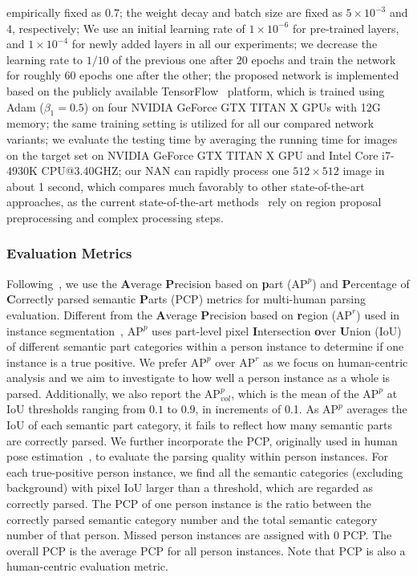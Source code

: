 \documentclass[10pt,twocolumn,letterpaper]{article}
\theoremstyle{definition}
\theoremstyle{remark}
\begin{document}
empirically fixed as $0.7$; the weight decay and batch size are fixed as $5{\times} 10^{-3}$ and $4$, respectively;  We use an initial learning rate of $1{\times} 10^{-6}$ for pre-trained layers, and $1{\times} 10^{-4}$ for newly added layers in all our experiments; we decrease the learning rate to $1/10$ of the previous one after 20 epochs and train the network for roughly 60 epochs one after the other; the proposed network is implemented based on the publicly available TensorFlow~\cite{abadi2016tensorflow} platform, which is trained using Adam ($\beta_1{=}0.5$) on four NVIDIA GeForce GTX TITAN X GPUs with 12G memory; the same training setting is utilized for all our compared network variants; we evaluate the testing time by averaging the running time for images on the target set on NVIDIA GeForce GTX TITAN X GPU and Intel Core i7-4930K CPU@3.40GHZ; our NAN can rapidly process one $512\times 512$ image in about 1 second, which compares much favorably to other state-of-the-art approaches, as the current state-of-the-art methods~\cite{li2017towards, jiang2016detangling, li2017holistic} rely on region proposal preprocessing and complex processing steps.

\vspace{-2mm}
\subsubsection{Evaluation Metrics}

Following~\cite{li2017towards}, we use the \textbf{A}verage \textbf{P}recision based on \textbf{p}art ($\mathrm{AP}^{p}$) and \textbf{P}ercentage of \textbf{C}orrectly parsed semantic \textbf{P}arts (PCP) metrics for multi-human parsing evaluation. Different from the \textbf{A}verage \textbf{P}recision based on \textbf{r}egion ($\mathrm{AP}^{r}$) used in instance segmentation~\cite{liang2015proposal, hariharan2014simultaneous}, $\mathrm{AP}^{p}$ uses part-level pixel \textbf{I}ntersection \textbf{o}ver \textbf{U}nion (IoU) of different semantic part categories within a person instance to determine if one instance is a true positive. We prefer $\mathrm{AP}^{p}$ over $\mathrm{AP}^{r}$ as we focus on human-centric analysis and we aim to investigate to how well a person instance as a whole is parsed. Additionally, we also report the $\mathrm{AP}^{p}_{vol}$, which is the mean of the $\mathrm{AP}^{p}$ at IoU thresholds ranging from $0.1$ to $0.9$, in increments of 0.1. As $\mathrm{AP}^{p}$ averages the IoU of each semantic part category, it fails to reflect how many semantic parts are correctly parsed. We further incorporate the PCP, originally used in human pose estimation~\cite{ferrari2008progressive, chen2014detect}, to evaluate the parsing quality within person instances. For each true-positive person instance, we find all the semantic categories (excluding background) with pixel IoU larger than a threshold, which are regarded as correctly parsed. The PCP of one person instance is the ratio between the correctly parsed semantic category number and the total semantic category number of that person. Missed person instances are assigned with $0$ PCP. The overall PCP is the average PCP for all person instances. Note that PCP is also a human-centric evaluation metric.
\end{document}
